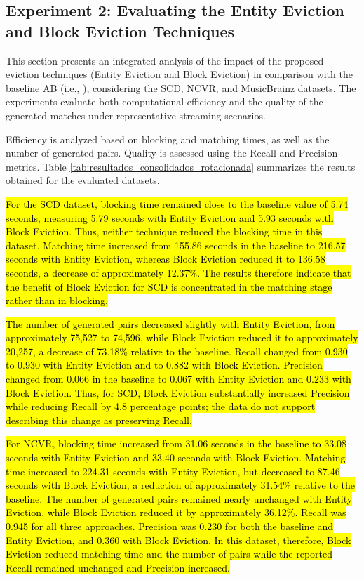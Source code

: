 \documentclass{ieeeaccess}
\begin{document}
\subsection{Experiment 2: Evaluating the Entity Eviction and Block Eviction Techniques}
This section presents an integrated analysis of the impact of the proposed eviction techniques (Entity Eviction and Block Eviction) in comparison with the baseline AB (i.e., \cite{10.1109/TKDE.2024.3361022}), considering the SCD, NCVR, and MusicBrainz datasets. The experiments evaluate both computational efficiency and the quality of the generated matches under representative streaming scenarios.

Efficiency is analyzed based on blocking and matching times, as well as the number of generated pairs. Quality is assessed using the Recall and Precision metrics. Table \ref{tab:resultados_consolidados_rotacionada} summarizes the results obtained for the evaluated datasets.

\hl{For the SCD dataset, blocking time remained close to the baseline value of 5.74 seconds, measuring 5.79 seconds with Entity Eviction and 5.93 seconds with Block Eviction. Thus, neither technique reduced the blocking time in this dataset. Matching time increased from 155.86 seconds in the baseline to 216.57 seconds with Entity Eviction, whereas Block Eviction reduced it to 136.58 seconds, a decrease of approximately 12.37\%. The results therefore indicate that the benefit of Block Eviction for SCD is concentrated in the matching stage rather than in blocking.}

\hl{The number of generated pairs decreased slightly with Entity Eviction, from approximately 75,527 to 74,596, while Block Eviction reduced it to approximately 20,257, a decrease of 73.18\% relative to the baseline. Recall changed from 0.930 to 0.930 with Entity Eviction and to 0.882 with Block Eviction. Precision changed from 0.066 in the baseline to 0.067 with Entity Eviction and 0.233 with Block Eviction. Thus, for SCD, Block Eviction substantially increased Precision while reducing Recall by 4.8 percentage points; the data do not support describing this change as preserving Recall.}

\hl{For NCVR, blocking time increased from 31.06 seconds in the baseline to 33.08 seconds with Entity Eviction and 33.40 seconds with Block Eviction. Matching time increased to 224.31 seconds with Entity Eviction, but decreased to 87.46 seconds with Block Eviction, a reduction of approximately 31.54\% relative to the baseline. The number of generated pairs remained nearly unchanged with Entity Eviction, while Block Eviction reduced it by approximately 36.12\%. Recall was 0.945 for all three approaches. Precision was 0.230 for both the baseline and Entity Eviction, and 0.360 with Block Eviction. In this dataset, therefore, Block Eviction reduced matching time and the number of pairs while the reported Recall remained unchanged and Precision increased.}
\end{document}
